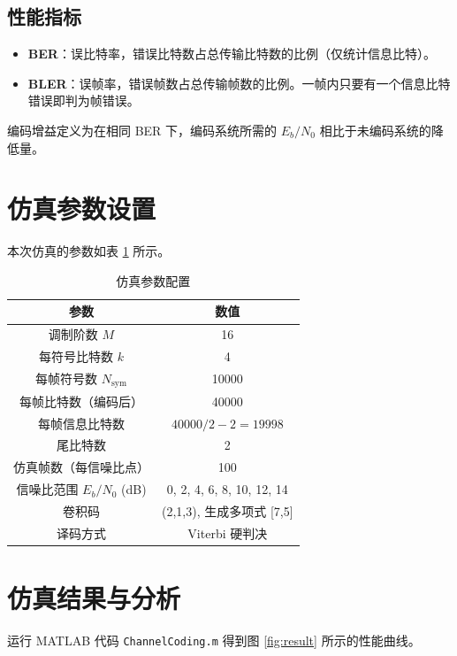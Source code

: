 \documentclass[UTF8]{ctexart}
\begin{document}
\subsection{性能指标}
\begin{itemize}
    \item \textbf{BER}：误比特率，错误比特数占总传输比特数的比例（仅统计信息比特）。
    \item \textbf{BLER}：误帧率，错误帧数占总传输帧数的比例。一帧内只要有一个信息比特错误即判为帧错误。
\end{itemize}
编码增益定义为在相同 BER 下，编码系统所需的 \(E_b/N_0\) 相比于未编码系统的降低量。

\section{仿真参数设置}
本次仿真的参数如表 \ref{tab:params} 所示。

\begin{table}[H]
    \centering
    \caption{仿真参数配置}
    \begin{tabular}{|c|c|}
        \hline
        \textbf{参数} & \textbf{数值} \\
        \hline
        调制阶数 \(M\) & 16 \\
        \hline
        每符号比特数 \(k\) & 4 \\
        \hline
        每帧符号数 \(N_{\text{sym}}\) & 10000 \\
        \hline
        每帧比特数（编码后） & 40000 \\
        \hline
        每帧信息比特数 & \(40000/2 - 2 = 19998\) \\
        \hline
        尾比特数 & 2 \\
        \hline
        仿真帧数（每信噪比点） & 100 \\
        \hline
        信噪比范围 \(E_b/N_0\) (dB) & 0, 2, 4, 6, 8, 10, 12, 14 \\
        \hline
        卷积码 & (2,1,3), 生成多项式 [7,5] \\
        \hline
        译码方式 & Viterbi 硬判决 \\
        \hline
    \end{tabular}
    \label{tab:params}
\end{table}

\section{仿真结果与分析}

运行 MATLAB 代码 \texttt{ChannelCoding.m} 得到图 \ref{fig:result} 所示的性能曲线。
\end{document}
